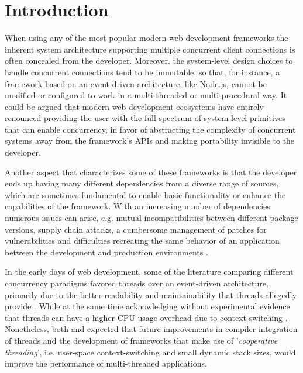 \section{Introduction}
When using any of the most popular modern web development frameworks the inherent system architecture supporting multiple concurrent client connections is often concealed from the developer. Moreover, the system-level design choices to handle concurrent connections tend to be immutable, so that, for instance, a framework based on an event-driven architecture, like Node.js, cannot be modified or configured to work in a multi-threaded or multi-procedural way. It could be argued that modern web development ecosystems have entirely renounced providing the user with the full spectrum of system-level primitives that can enable concurrency, in favor of abstracting the complexity of concurrent systems away from the framework's APIs and making portability invisible to the developer.

Another aspect that characterizes some of these frameworks is that the developer ends up having many different dependencies from a diverse range of sources, which are sometimes fundamental to enable basic functionality or enhance the capabilities of the framework. With an increasing number of dependencies numerous issues can arise, e.g. mutual incompatibilities between different package versions, supply chain attacks, a cumbersome management of patches for vulnerabilities and difficulties recreating the same behavior of an application between the development and production environments \cite{2012PoulHenning}. 

In the early days of web development, some of the literature comparing different concurrency paradigms favored threads over an event-driven architecture, primarily due to the better readability and maintainability that threads allegedly provide \cite{2003Events}\cite{2005Threads}. While at the same time acknowledging without experimental evidence that threads can have a higher CPU usage overhead due to context-switching \cite{2003Events}. Nonetheless, both \cite{2003Events} and \cite{2005Threads} expected that future improvements in compiler integration of threads and the development of frameworks that make use of '\textit{cooperative threading}', i.e. user-space context-switching and small dynamic stack sizes, would improve the performance of multi-threaded applications.


